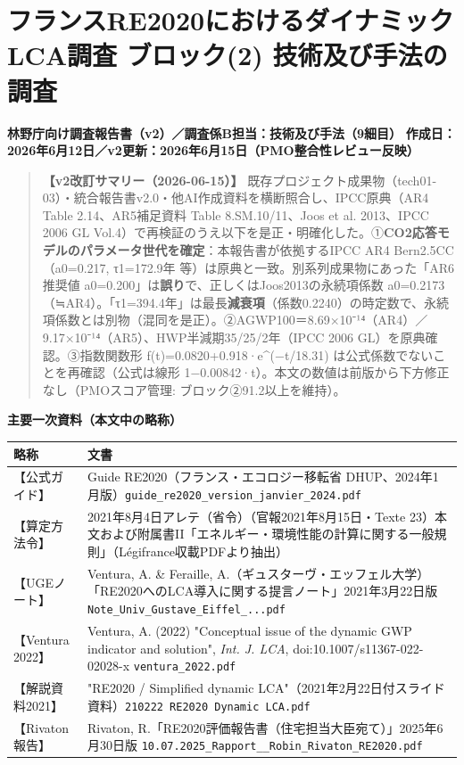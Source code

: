 \documentclass[11pt]{article}
\begin{document}
\hypertarget{ux30d5ux30e9ux30f3ux30b9re2020ux306bux304aux3051ux308bux30c0ux30a4ux30caux30dfux30c3ux30aflcaux8abfux67fb-ux30d6ux30edux30c3ux30af2-ux6280ux8853ux53caux3073ux624bux6cd5ux306eux8abfux67fb}{%
\section{フランスRE2020におけるダイナミックLCA調査 ブロック(2)
技術及び手法の調査}\label{ux30d5ux30e9ux30f3ux30b9re2020ux306bux304aux3051ux308bux30c0ux30a4ux30caux30dfux30c3ux30aflcaux8abfux67fb-ux30d6ux30edux30c3ux30af2-ux6280ux8853ux53caux3073ux624bux6cd5ux306eux8abfux67fb}}

\textbf{林野庁向け調査報告書（v2）／調査係B担当：技術及び手法（9細目）}
\textbf{作成日：2026年6月12日／v2更新：2026年6月15日（PMO整合性レビュー反映）}

\begin{quote}
\textbf{【v2改訂サマリー（2026-06-15）】}
既存プロジェクト成果物（tech01-03）・統合報告書v2.0・他AI作成資料を横断照合し、IPCC原典（AR4
Table 2.14、AR5補足資料 Table 8.SM.10/11、Joos et al. 2013、IPCC 2006 GL
Vol.4）で再検証のうえ以下を是正・明確化した。①\textbf{CO2応答モデルのパラメータ世代を確定}：本報告書が依拠するIPCC
AR4 Bern2.5CC（a0=0.217, τ1=172.9年
等）は原典と一致。別系列成果物にあった「AR6推奨値
a0=0.200」は\textbf{誤り}で、正しくはJoos2013の永続項係数
a0=0.2173（≒AR4）。「τ1=394.4年」は最長\textbf{減衰項}（係数0.2240）の時定数で、永続項係数とは別物（混同を是正）。②AGWP100＝8.69×10⁻¹⁴（AR4）／9.17×10⁻¹⁴（AR5）、HWP半減期35/25/2年（IPCC
2006 GL）を原典確認。③指数関数形 f(t)=0.0820+0.918·e\^{}(−t/18.31)
は公式係数でないことを再確認（公式は線形
1−0.00842·t）。本文の数値は前版から下方修正なし（PMOスコア管理:
ブロック②91.2以上を維持）。
\end{quote}

\textbf{主要一次資料（本文中の略称）}

\begin{longtable}[]{@{}ll@{}}
\toprule
略称 & 文書\tabularnewline
\midrule
\endhead
【公式ガイド】 & Guide RE2020（フランス・エコロジー移転省
DHUP、2024年1月版）\texttt{guide\_re2020\_version\_janvier\_2024.pdf}\tabularnewline
【算定方法令】 & 2021年8月4日アレテ（省令）（官報2021年8月15日・Texte
23）本文および附属書II「エネルギー・環境性能の計算に関する一般規則」（Légifrance収載PDFより抽出）\tabularnewline
【UGEノート】 & Ventura, A. \& Feraille,
A.（ギュスターヴ・エッフェル大学）「RE2020へのLCA導入に関する提言ノート」2021年3月22日版
\texttt{Note\_Univ\_Gustave\_Eiffel\_...pdf}\tabularnewline
【Ventura 2022】 & Ventura, A. (2022) "Conceptual issue of the dynamic
GWP indicator and solution", \emph{Int. J. LCA},
doi:10.1007/s11367-022-02028-x \texttt{ventura\_2022.pdf}\tabularnewline
【解説資料2021】 & "RE2020 / Simplified dynamic
LCA"（2021年2月22日付スライド資料）\texttt{210222\ RE2020\ Dynamic\ LCA.pdf}\tabularnewline
【Rivaton報告】 & Rivaton,
R.「RE2020評価報告書（住宅担当大臣宛て）」2025年6月30日版
\texttt{10.07.2025\_Rapport\_\_Robin\_Rivaton\_RE2020.pdf}\tabularnewline
\bottomrule
\end{longtable}
\end{document}
